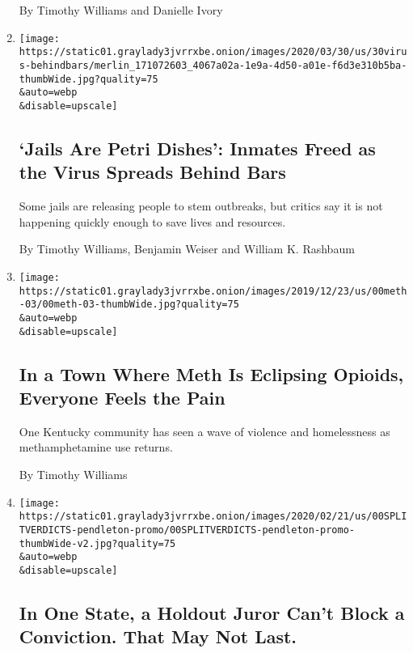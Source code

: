 \begin{enumerate}
  By Timothy Williams and Danielle Ivory
\item
  \href{/2020/03/30/us/coronavirus-prisons-jails.html}{}

  \texttt{[image: https://static01.graylady3jvrrxbe.onion/images/2020/03/30/us/30virus-behindbars/merlin\_171072603\_4067a02a-1e9a-4d50-a01e-f6d3e310b5ba-thumbWide.jpg?quality=75\\\&auto=webp\\\&disable=upscale]}

  \hypertarget{jails-are-petri-dishes-inmates-freed-as-the-virus-spreads-behind-bars}{%
  \subsection{`Jails Are Petri Dishes': Inmates Freed as the Virus
  Spreads Behind
  Bars}\label{jails-are-petri-dishes-inmates-freed-as-the-virus-spreads-behind-bars}}

  Some jails are releasing people to stem outbreaks, but critics say it
  is not happening quickly enough to save lives and resources.

  By Timothy Williams, Benjamin Weiser and William K. Rashbaum
\item
  \href{/2020/03/28/us/methamphetamine-kentucky-effects.html}{}

  \texttt{[image: https://static01.graylady3jvrrxbe.onion/images/2019/12/23/us/00meth-03/00meth-03-thumbWide.jpg?quality=75\\\&auto=webp\\\&disable=upscale]}

  \hypertarget{in-a-town-where-meth-is-eclipsing-opioids-everyone-feels-the-pain}{%
  \subsection{In a Town Where Meth Is Eclipsing Opioids, Everyone Feels
  the
  Pain}\label{in-a-town-where-meth-is-eclipsing-opioids-everyone-feels-the-pain}}

  One Kentucky community has seen a wave of violence and homelessness as
  methamphetamine use returns.

  By Timothy Williams
\item
  \href{/2020/02/23/us/oregon-court-case-verdicts.html}{}

  \texttt{[image: https://static01.graylady3jvrrxbe.onion/images/2020/02/21/us/00SPLITVERDICTS-pendleton-promo/00SPLITVERDICTS-pendleton-promo-thumbWide-v2.jpg?quality=75\\\&auto=webp\\\&disable=upscale]}

  \hypertarget{in-one-state-a-holdout-juror-cant-block-a-conviction-that-may-not-last}{%
  \subsection{In One State, a Holdout Juror Can't Block a Conviction.
  That May Not
  Last.}\label{in-one-state-a-holdout-juror-cant-block-a-conviction-that-may-not-last}}


\end{enumerate}
